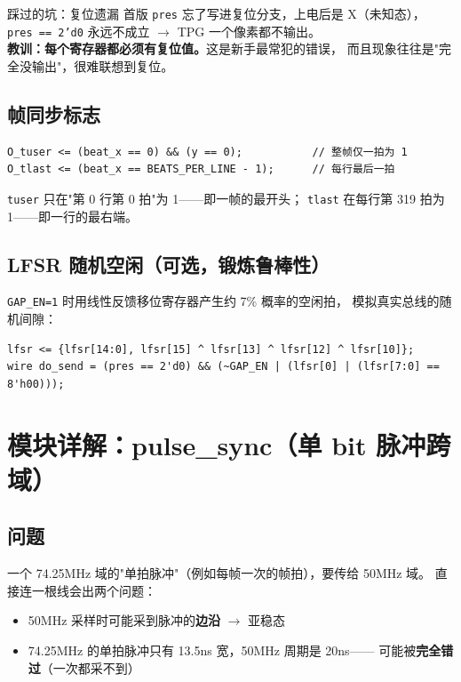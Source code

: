\begin{warnbox}{踩过的坑：复位遗漏}
首版 \texttt{pres} 忘了写进复位分支，上电后是 X（未知态），
\texttt{pres == 2'd0} 永远不成立 $\to$ TPG 一个像素都不输出。
\\[4pt]
\textbf{教训：每个寄存器都必须有复位值。}这是新手最常犯的错误，
而且现象往往是"完全没输出"，很难联想到复位。
\end{warnbox}

\subsection{帧同步标志}

\begin{Verbatim}[frame=single,fontsize=\small]
O_tuser <= (beat_x == 0) && (y == 0);           // 整帧仅一拍为 1
O_tlast <= (beat_x == BEATS_PER_LINE - 1);      // 每行最后一拍
\end{Verbatim}

\texttt{tuser} 只在"第 0 行第 0 拍"为 1——即一帧的最开头；
\texttt{tlast} 在每行第 319 拍为 1——即一行的最右端。

\subsection{LFSR 随机空闲（可选，锻炼鲁棒性）}

\texttt{GAP\_EN=1} 时用线性反馈移位寄存器产生约 7\% 概率的空闲拍，
模拟真实总线的随机间隙：

\begin{Verbatim}[frame=single,fontsize=\small]
lfsr <= {lfsr[14:0], lfsr[15] ^ lfsr[13] ^ lfsr[12] ^ lfsr[10]};
wire do_send = (pres == 2'd0) && (~GAP_EN | (lfsr[0] | (lfsr[7:0] == 8'h00)));
\end{Verbatim}

\section{模块详解：pulse\_sync（单 bit 脉冲跨域）}

\subsection{问题}

一个 74.25MHz 域的"单拍脉冲"（例如每帧一次的帧拍），要传给 50MHz 域。
直接连一根线会出两个问题：

\begin{itemize}
  \item 50MHz 采样时可能采到脉冲的\textbf{边沿} $\to$ 亚稳态
  \item 74.25MHz 的单拍脉冲只有 13.5ns 宽，50MHz 周期是 20ns——
        可能被\textbf{完全错过}（一次都采不到）
\end{itemize}

